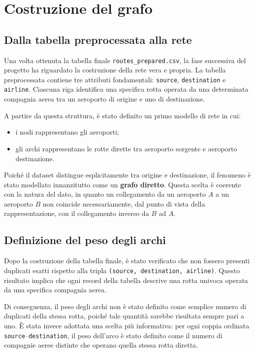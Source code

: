 \chapter{Costruzione del grafo}

\section{Dalla tabella preprocessata alla rete}

Una volta ottenuta la tabella finale \texttt{routes\_prepared.csv}, la fase successiva del progetto ha riguardato la costruzione della rete vera e propria. La tabella preprocessata contiene tre attributi fondamentali: \texttt{source}, \texttt{destination} e \texttt{airline}. Ciascuna riga identifica una specifica rotta operata da una determinata compagnia aerea tra un aeroporto di origine e uno di destinazione.

A partire da questa struttura, è stato definito un primo modello di rete in cui:
\begin{itemize}
    \item i nodi rappresentano gli aeroporti;
    \item gli archi rappresentano le rotte dirette tra aeroporto sorgente e aeroporto destinazione.
\end{itemize}

Poiché il dataset distingue esplicitamente tra origine e destinazione, il fenomeno è stato modellato innanzitutto come un \textbf{grafo diretto}. Questa scelta è coerente con la natura del dato, in quanto un collegamento da un aeroporto \(A\) a un aeroporto \(B\) non coincide necessariamente, dal punto di vista della rappresentazione, con il collegamento inverso da \(B\) ad \(A\).

\section{Definizione del peso degli archi}

Dopo la costruzione della tabella finale, è stato verificato che non fossero presenti duplicati esatti rispetto alla tripla \texttt{(source, destination, airline)}. Questo risultato implica che ogni record della tabella descrive una rotta univoca operata da una specifica compagnia aerea.

Di conseguenza, il peso degli archi non è stato definito come semplice numero di duplicati della stessa rotta, poiché tale quantità sarebbe risultata sempre pari a uno. È stata invece adottata una scelta più informativa: per ogni coppia ordinata \texttt{source}--\texttt{destination}, il peso dell’arco è stato definito come il numero di compagnie aeree distinte che operano quella stessa rotta diretta.

